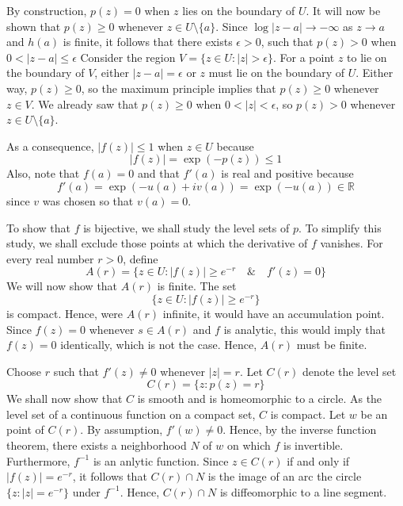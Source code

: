\documentclass[12pt]{article}
\begin{document}
By construction, $p(z) = 0$ when $z$ lies on the boundary of $U$.  It will now be shown that $p(z) \ge 0$ whenever $z \in U \setminus \{a\}$.  Since $\log |z - a| \to - \infty$ as $z \to a$ and $h(a)$ is finite, it follows that there exists $\epsilon > 0$, such that $p(z) > 0$ when $0 < |z - a| \le \epsilon$  Consider the region $V = \{z \in U \colon |z| > \epsilon\}$.  For a point $z$ to lie on the boundary of $V$, either $|z - a| = \epsilon$ or $z$ must lie on the boundary of $U$.  Either way, $p(z) \ge 0$, so the maximum principle implies that $p(z) \ge 0$ whenever $z \in V$.  We already saw that $p(z) \ge 0$ when $0 < |z| < \epsilon$, so $p(z) > 0$ whenever $z \in U \setminus \{a\}$.

As a consequence, $|f(z)| \le 1$ when $z \in U$ because
 $$|f(z)| = \exp \left( -p(z) \right) \le 1$$
Also, note that $f(a) = 0$ and that $f'(a)$ is real and positive because
 $$f'(a) = \exp \left( -u(a) + i v(a) \right) = \exp \left( -u(a) \right) \in \mathbb{R}$$
since $v$ was chosen so that $v(a) = 0$.

To show that $f$ is bijective, we shall study the level sets of $p$.  To simplify this study, we shall exclude those points at which the derivative of $f$ vanishes.  For every real number $r > 0$, define
 $$A(r) = \{ z \in U \colon |f(z)| \ge e^{-r} \quad \& \quad f'(z) = 0 \}$$
We will now show that $A(r)$ is finite.  The set
 $$\{ z \in U \colon |f(z)| \ge e^{-r} \}$$
is compact.  Hence, were $A(r)$ infinite, it would have an accumulation point.  Since $f(z) = 0$ whenever $s \in A(r)$ and $f$ is analytic, this would imply that $f(z) = 0$ identically, which is not the case.  Hence, $A(r)$ must be finite.

Choose $r$ such that $f'(z) \ne 0$ whenever $|z| = r$.  Let $C(r)$ denote the level set
 $$C(r) = \{ z \colon p(z) = r \}$$
We shall now show that $C$ is smooth and is homeomorphic to a circle.  As the level set of a  continuous function on a compact set, $C$ is compact.  Let $w$ be an point of $C(r)$.  By assumption, $f'(w) \ne 0$.  Hence, by the inverse function theorem, there exists a neighborhood $N$ of $w$ on which $f$ is invertible.  Furthermore, $f^{-1}$ is an anlytic function.  Since $z \in C(r)$ if and only if $|f(z)| = e^{-r}$, it follows that $C(r) \cap N$ is the image of an arc the circle $\{ z \colon |z| = e^{-r} \}$ under $f^{-1}$.  Hence, $C(r) \cap N$ is diffeomorphic to a line segment.
\end{document}
